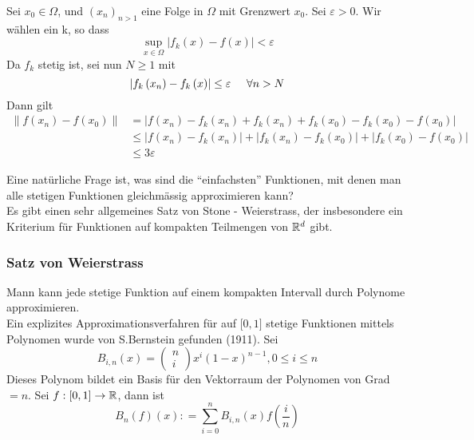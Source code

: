 \begin{beweis}{4.31}
Sei $x_0\in\Omega$, und $\left( x_n\right)_{n>1}$ eine Folge in $\Omega$ mit Grenzwert $x_0$. Sei $\varepsilon>0$. Wir wählen ein k, so dass
\[\mathop {\sup }\limits_{x \in \Omega } \left| {{f_k}(x) - f(x)} \right| < \varepsilon \]
Da $f_k$ stetig ist, sei nun $N\geq 1$ mit
\[\left| {{f_k}\left( {{x_n}} \right) - {f_k}\left( x \right)} \right| \le \varepsilon \hspace{5mm}\forall n > N\]
Dann gilt
\begin{align*}
\left\| {f\left( {{x_n}} \right) - f\left( {{x_0}} \right)} \right\| &= \left| {f\left( {{x_n}} \right) - {f_k}\left( {{x_n}} \right) + {f_k}\left( {{x_n}} \right) + {f_k}\left( {{x_0}} \right) - {f_k}\left( {{x_0}} \right) - f\left( {{x_0}} \right)} \right|\\
 &\le \left| {f\left( {{x_n}} \right) - {f_k}\left( {{x_n}} \right)} \right| + \left| {{f_k}\left( {{x_n}} \right) - {f_k}\left( {{x_0}} \right)} \right| + \left| {{f_k}\left( {{x_0}} \right) - f\left( {{x_0}} \right)} \right|\\
 &\le 3\varepsilon
\end{align*}
\end{beweis}
Eine natürliche Frage ist, was sind die ``einfachsten'' Funktionen, mit denen man alle stetigen Funktionen gleichmässig approximieren kann?\\
Es gibt einen sehr allgemeines Satz von Stone - Weierstrass, der insbesondere ein Kriterium für Funktionen auf kompakten Teilmengen von $\mathbb{R}^d$ gibt.
\subsubsection*{Satz von Weierstrass}
Mann kann jede stetige Funktion auf einem kompakten Intervall durch Polynome approximieren. \\

Ein explizites Approximationsverfahren für auf $\lbrack 0,1\rbrack$ stetige Funktionen mittels Polynomen wurde von S.Bernstein gefunden (1911). Sei
\[{B_{i,n}}(x) = \left( {\begin{array}{*{20}{c}}
n\\
i
\end{array}} \right){x^i}{\left( {1 - x} \right)^{n - 1}},0 \le i \le n\]
Dieses Polynom bildet ein Basis für den Vektorraum der Polynomen von Grad $=n$. Sei $f:\lbrack 0,1\rbrack\to\mathbb{R}$, dann ist
\[{B_n}\left( f \right)(x): = \sum\limits_{i = 0}^n {{B_{i,n}}\left( x \right)f\left( {\frac{i}{n}} \right)} \]
